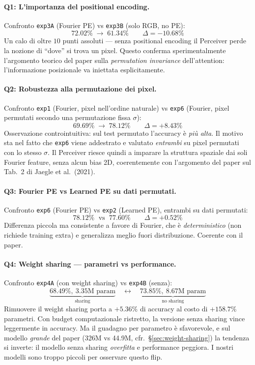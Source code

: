 \documentclass[
  11pt,
]{article}
\begin{document}
\paragraph{Q1: L'importanza del positional encoding.}
Confronto \texttt{exp3A} (Fourier PE) vs \texttt{exp3B} (solo RGB, no PE):
\[
72.02\% \;\longrightarrow\; 61.34\% \qquad \Delta = -10.68\%
\]
Un calo di oltre $10$ punti assoluti --- senza positional encoding il Perceiver perde la nozione di ``dove'' si trova un pixel. Questo conferma sperimentalmente l'argomento teorico del paper sulla \emph{permutation invariance} dell'attention: l'informazione posizionale va iniettata esplicitamente.

\paragraph{Q2: Robustezza alla permutazione dei pixel.}
Confronto \texttt{exp1} (Fourier, pixel nell'ordine naturale) vs \texttt{exp6} (Fourier, pixel permutati secondo una permutazione fissa $\sigma$):
\[
69.69\% \;\longrightarrow\; 78.12\% \qquad \Delta = +8.43\%
\]
Osservazione controintuitiva: sul test permutato l'accuracy è \emph{più alta}. Il motivo sta nel fatto che \texttt{exp6} viene addestrato e valutato \emph{entrambi} su pixel permutati con lo stesso $\sigma$. Il Perceiver riesce quindi a imparare la struttura spaziale dai soli Fourier feature, senza alcun bias 2D, coerentemente con l'argomento del paper sul Tab.\ 2 di Jaegle et al.\ (2021).

\paragraph{Q3: Fourier PE vs Learned PE su dati permutati.}
Confronto \texttt{exp6} (Fourier PE) vs \texttt{exp2} (Learned PE), entrambi su dati permutati:
\[
78.12\% \;\text{ vs }\; 77.60\% \qquad \Delta = +0.52\%
\]
Differenza piccola ma consistente a favore di Fourier, che è \emph{deterministico} (non richiede training extra) e generalizza meglio fuori distribuzione. Coerente con il paper.

\paragraph{Q4: Weight sharing --- parametri vs performance.}
Confronto \texttt{exp4A} (con weight sharing) vs \texttt{exp4B} (senza):
\[
\underbrace{68.49\%,\ 3.35\text{M param}}_{\text{sharing}} \quad \longleftrightarrow \quad \underbrace{73.85\%,\ 8.67\text{M param}}_{\text{no sharing}}
\]
Rimuovere il weight sharing porta a $+5.36\%$ di accuracy al costo di $+158.7\%$ parametri. Con budget computazionale ristretto, la versione senza sharing vince leggermente in accuracy. Ma il guadagno per parametro è sfavorevole, e sul modello \emph{grande} del paper (326M vs 44.9M, cfr.\ §\ref{sec:weight-sharing}) la tendenza si inverte: il modello senza sharing \emph{overfitta} e performance peggiora. I nostri modelli sono troppo piccoli per osservare questo flip.
\end{document}
